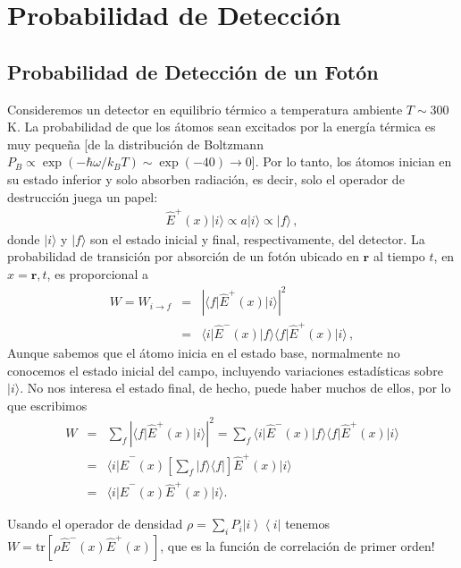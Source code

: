 \documentclass[twocolumn,aps,eqsecnum,showkeys,amsmath]{revtex4}
\newcommand{\mbr}{\mathbf{r}}
\providecommand{\bra}[1]{\langle #1 \rvert}
\providecommand{\ket}[1]{\lvert #1 \rangle}
\providecommand{\tr}[1]{\text{tr}\left[ #1 \right]}
\newcommand{\ketbra}[2]{\left| {#1} \right\rangle\left\langle {#2}\right|}
\begin{document}
\section{Probabilidad de Detecci\'on}
\subsection{Probabilidad de Detecci\'on de un Fot\'on} 
Consideremos un detector en equilibrio t\'ermico a temperatura ambiente 
$T \sim 300$ K. La probabilidad de que los \'atomos sean excitados por la 
energ\'ia t\'ermica es muy peque\~na [de la distribuci\'on de Boltzmann 
$P_B \propto \exp{(-\hbar \omega/k_B T)} \sim \exp{(-40)} \to 0$]. Por lo 
tanto, los \'atomos inician en su estado inferior y solo absorben radiaci\'on, 
es decir, solo el operador de destrucci\'on juega un papel: 
%
\begin{eqnarray}
\hat{E}^+ (x) \ket{i} \propto a \ket{i} \propto \ket{f} \,, 
\end{eqnarray}
donde $\ket{i}$ y $\ket{f}$ son el estado inicial y final, respectivamente, 
del detector. La probabilidad de transici\'on por absorci\'on de un fot\'on 
ubicado en  $\mbr$ al tiempo $t$, en $x= \mbr, t$, es proporcional a 
%
\begin{eqnarray}
W = W_{i \to f} &=& |\bra{f} \hat{E}^+ (x) \ket{i} |^2 	\nonumber \\
	&=&  \bra{i} \hat{E}^- (x) \ket{f} \bra{f} \hat{E}^+ (x) \ket{i} \,, 
\end{eqnarray}
Aunque sabemos que el \'atomo inicia en el estado base, normalmente 
no conocemos el estado inicial del campo, incluyendo variaciones 
estad\'isticas sobre $\ket{i}$. No nos interesa el estado final, de hecho, 
puede haber muchos de ellos, por lo que escribimos  
%
\begin{eqnarray}
W &=& \sum_f |\bra{f} \hat{E}^+ (x) \ket{i} |^2 
  = \sum_f \bra{i} \hat{E}^- (x) \ket{f} \bra{f} \hat{E}^+ (x) \ket{i} \nonumber \\ 
&=& \bra{i} \hat{E}^- (x) \left[ \sum_f \ket{f} \bra{f} \right] 
    \hat{E}^+ (x) \ket{i} 	\nonumber \\ 
    &=& \bra{i} \hat{E}^- (x)  \hat{E}^+ (x) \ket{i} . 
\end{eqnarray}

 Usando el operador de densidad 
$\rho = \sum_i P_i \ketbra{i}{i}$ tenemos 
$W= \tr{\rho \hat{E}^- (x)  \hat{E}^+ (x)}$, que es la funci\'on de correlaci\'on 
de primer orden!
\end{document}
